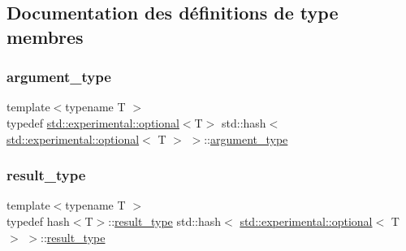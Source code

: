 \subsection{Documentation des définitions de type membres}
\mbox{\label{structstd_1_1hash_3_01std_1_1experimental_1_1optional_3_01_t_01_4_01_4_a990f41de75472068a98961bde97c9f6f}} 
\subsubsection{\texorpdfstring{argument\+\_\+type}{argument\_type}}
{\footnotesize\ttfamily template$<$typename T $>$ \\
typedef \hyperlink{classstd_1_1experimental_1_1optional}{std\+::experimental\+::optional}$<$T$>$ std\+::hash$<$ \hyperlink{classstd_1_1experimental_1_1optional}{std\+::experimental\+::optional}$<$ T $>$ $>$\+::\hyperlink{structstd_1_1hash_3_01std_1_1experimental_1_1optional_3_01_t_01_4_01_4_a990f41de75472068a98961bde97c9f6f}{argument\+\_\+type}}

\mbox{\label{structstd_1_1hash_3_01std_1_1experimental_1_1optional_3_01_t_01_4_01_4_a1ffc134496ff2e1dedb167899d460b6b}} 
\subsubsection{\texorpdfstring{result\+\_\+type}{result\_type}}
{\footnotesize\ttfamily template$<$typename T $>$ \\
typedef hash$<$T$>$\+::\hyperlink{structstd_1_1hash_3_01std_1_1experimental_1_1optional_3_01_t_01_4_01_4_a1ffc134496ff2e1dedb167899d460b6b}{result\+\_\+type} std\+::hash$<$ \hyperlink{classstd_1_1experimental_1_1optional}{std\+::experimental\+::optional}$<$ T $>$ $>$\+::\hyperlink{structstd_1_1hash_3_01std_1_1experimental_1_1optional_3_01_t_01_4_01_4_a1ffc134496ff2e1dedb167899d460b6b}{result\+\_\+type}}



